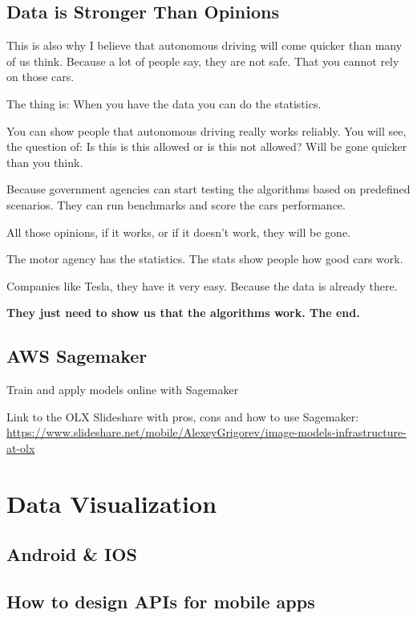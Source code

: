 \documentclass[12pt, numbers=noenddot]{scrreprt} %
\begin{document}
\section{Data is Stronger Than Opinions}

This is also why I believe that autonomous driving will come quicker than many of us think. Because a lot of people say, they are not safe. That you cannot rely on those cars.

The thing is: When you have the data you can do the statistics.

You can show people that autonomous driving really works reliably. You will see, the question of: Is this is this allowed or is this not allowed? Will be gone quicker than you think.

Because government agencies can start testing the algorithms based on predefined scenarios. They can run benchmarks and score the cars performance.

All those opinions, if it works, or if it doesn’t work, they will be gone.

The motor agency has the statistics. The stats show people how good cars work.

Companies like Tesla, they have it very easy. Because the data is already there.

\textbf{They just need to show us that the algorithms work. The end.}

\section{AWS Sagemaker}

Train and apply models online with Sagemaker

Link to the OLX Slideshare with pros, cons and how to use Sagemaker:
\url{https://www.slideshare.net/mobile/AlexeyGrigorev/image-models-infrastructure-at-olx}


\chapter{Data Visualization}

\section{Android \& IOS }
\section{How to design APIs for mobile apps}
\end{document}
